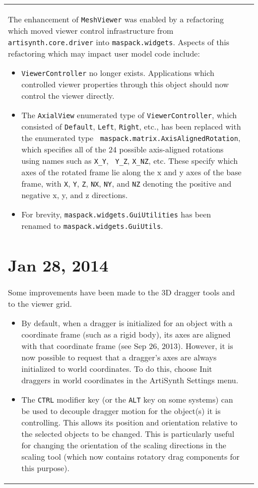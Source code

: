 \documentclass{article}
\begin{document}
\begin{tabular}{ll}
The enhancement of {\tt MeshViewer} was enabled by a refactoring which
moved viewer control infrastructure from {\tt artisynth.core.driver} into
{\tt maspack.widgets}. Aspects of this refactoring which may impact
user model code include:

\begin{itemize}

\item {\tt ViewerController} no longer exists. Applications which
controlled viewer properties through this object should now control
the viewer directly.

\item The {\tt AxialView} enumerated type of {\tt ViewerController},
which consisted of {\tt Default}, {\tt Left}, {\tt Right}, etc., has
been replaced with the enumerated type {\tt
maspack.matrix.AxisAlignedRotation}, which specifies all of the 24
possible axis-aligned rotations using names such as {\tt X\_Y}, {\tt
Y\_Z}, {\tt X\_NZ}, etc. These specify which axes of the rotated frame
lie along the x and y axes of the base frame, with {\tt X}, {\tt Y},
{\tt Z}, {\tt NX}, {\tt NY}, and {\tt NZ} denoting the positive and
negative x, y, and z directions.

\item For brevity, {\tt maspack.widgets.GuiUtilities} has been renamed
to {\tt maspack.widgets.GuiUtils}.

\end{itemize}

\section*{Jan 28, 2014}

Some improvements have been made to the 3D dragger tools and to the
viewer grid.

\begin{itemize}

\item By default, when a dragger is initialized for an object with a
coordinate frame (such as a rigid body), its axes are aligned with
that coordinate frame (see Sep 26, 2013). However, it is now possible
to request that a dragger's axes are always initialized to world
coordinates. To do this, choose {\sf Init draggers in world
coordinates} in the ArtiSynth {\sf Settings} menu.

\item The {\tt CTRL} modifier key (or the {\tt ALT} key on some
systems) can be used to decouple dragger motion for the object(s) it
is controlling. This allows its position and orientation relative to
the selected objects to be changed. This is particularly useful for
changing the orientation of the scaling directions in the scaling
tool (which now contains rotatory drag components for this
purpose).


\end{itemize}
\end{tabular}
\end{document}
